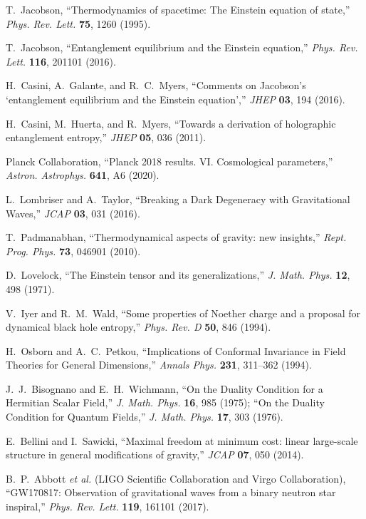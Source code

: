 \documentclass[aps,prd,onecolumn,superscriptaddress,nofootinbib]{revtex4-2}
\begin{document}

\begin{thebibliography}{99}

T.~Jacobson, ``Thermodynamics of spacetime: The Einstein equation of state,'' \emph{Phys. Rev. Lett.} \textbf{75}, 1260 (1995).

T.~Jacobson, ``Entanglement equilibrium and the Einstein equation,'' \emph{Phys. Rev. Lett.} \textbf{116}, 201101 (2016).

H.~Casini, A.~Galante, and R.~C.~Myers, ``Comments on Jacobson’s `entanglement equilibrium and the Einstein equation','' \emph{JHEP} \textbf{03}, 194 (2016).

H.~Casini, M.~Huerta, and R.~Myers, ``Towards a derivation of holographic entanglement entropy,'' \emph{JHEP} \textbf{05}, 036 (2011).

Planck Collaboration, ``Planck 2018 results. VI. Cosmological parameters,'' \emph{Astron. Astrophys.} \textbf{641}, A6 (2020).

L.~Lombriser and A.~Taylor, ``Breaking a Dark Degeneracy with Gravitational Waves,'' \emph{JCAP} \textbf{03}, 031 (2016).

T.~Padmanabhan, ``Thermodynamical aspects of gravity: new insights,'' \emph{Rept. Prog. Phys.} \textbf{73}, 046901 (2010).

D.~Lovelock, ``The Einstein tensor and its generalizations,'' \emph{J. Math. Phys.} \textbf{12}, 498 (1971).

V.~Iyer and R.~M.~Wald, ``Some properties of Noether charge and a proposal for dynamical black hole entropy,'' \emph{Phys. Rev. D} \textbf{50}, 846 (1994).

H.~Osborn and A.~C.~Petkou, ``Implications of Conformal Invariance in Field Theories for General Dimensions,'' \emph{Annals Phys.} \textbf{231}, 311--362 (1994).

J.~J.~Bisognano and E.~H.~Wichmann, ``On the Duality Condition for a Hermitian Scalar Field,'' \emph{J. Math. Phys.} \textbf{16}, 985 (1975); ``On the Duality Condition for Quantum Fields,'' \emph{J. Math. Phys.} \textbf{17}, 303 (1976).

E.~Bellini and I.~Sawicki, ``Maximal freedom at minimum cost: linear large-scale structure in general modifications of gravity,'' \emph{JCAP} \textbf{07}, 050 (2014).

B.~P.~Abbott \emph{et al.} (LIGO Scientific Collaboration and Virgo Collaboration), ``GW170817: Observation of gravitational waves from a binary neutron star inspiral,'' \emph{Phys. Rev. Lett.} \textbf{119}, 161101 (2017).

\end{thebibliography}
\end{document}
